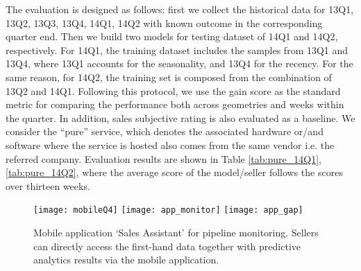 \documentclass[10pt,conference]{IEEEtran}
\begin{document}
The evaluation is designed as follows: first we collect the historical data for 13Q1, 13Q2, 13Q3, 13Q4, 14Q1, 14Q2 with known outcome in the corresponding quarter end.
Then we build two models for testing dataset of 14Q1 and 14Q2, respectively. For 14Q1, the training dataset includes the samples from 13Q1 and 13Q4, where 13Q1 accounts for the seasonality, and 13Q4 for the recency.
For the same reason, for 14Q2, the training set is composed from the combination of 13Q2 and 14Q1. Following this protocol, we use the gain score as the standard metric for comparing the performance both across geometries and weeks within the quarter.
In addition, sales subjective rating is also evaluated as a baseline. We consider the ``pure'' service, which denotes the associated hardware or/and software where the service is hosted also comes from the same vendor i.e. the referred company. Evaluation results are shown in Table \ref{tab:pure_14Q1}, \ref{tab:pure_14Q2}, where the average score of the model/seller follows the scores over thirteen weeks.
\begin{figure}[t]
\centering
\texttt{[image: mobileQ4]}
\texttt{[image: app\_monitor]}
\texttt{[image: app\_gap]}
\caption{Mobile application `Sales Assistant' for pipeline monitoring. Sellers can directly access the first-hand data together with predictive analytics results via the mobile application.}
\label{fig:app_snapshot}
\vspace{-5pt}
\end{figure}
\end{document}
